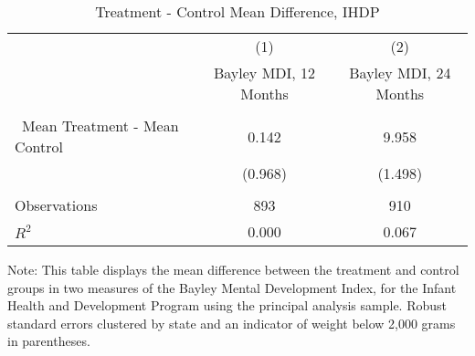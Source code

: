 \begin{table}[H] 
\begin{threeparttable}
\caption{Treatment - Control Mean Difference, IHDP}
\label{table:ihdp}
\centering 
\begin{tabular}{lcc} \hline \hline
 & (1) & (2) \\
 & Bayley MDI, 12 Months & Bayley MDI, 24 Months \\ \hline
 &  &  \\\
Mean Treatment - Mean Control & 0.142 & 9.958 \\
 & (0.968) & (1.498) \\
 &  &  \\ \hline
Observations & 893 & 910 \\
$R^2$ & 0.000 & 0.067 \\ \hline \hline  
\end{tabular}
\begin{tablenotes}
\footnotesize
\item Note: This table displays the mean difference between the treatment and control groups in two measures of the Bayley Mental Development Index, for the Infant Health and Development Program using the principal analysis sample. Robust standard errors clustered by state and an indicator of weight below 2,000 grams in parentheses.
\end{tablenotes}
\end{threeparttable}
\end{table}
